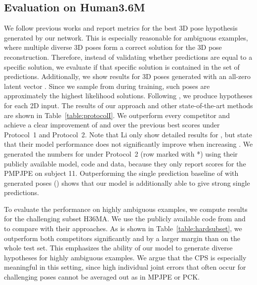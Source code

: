 \documentclass[10pt,twocolumn,letterpaper]{article}
\begin{document}
\subsection{Evaluation on Human3.6M}
We follow previous works and report metrics for the best 3D pose hypothesis generated by our network. 
This is especially reasonable for ambiguous examples, where multiple diverse 3D poses form a correct solution for the 3D pose reconstruction.
Therefore, instead of validating whether predictions are equal to a specific solution, we evaluate if that specific solution is contained in the set of predictions.
Additionally, we show results for 3D poses generated with an all-zero latent vector .
Since we sample  from  during training, such poses are approximately the highest likelihood solutions.
Following \cite{Sharma_2019_ICCV}, we produce  hypotheses for each 2D input. 
The results of our approach and other state-of-the-art methods are shown in Table~\ref{table:protocolI}. 
We outperform every competitor and achieve a clear improvement of  and  over the previous best scores under Protocol~1 and Protocol~2.
Note that Li \etal \cite{Li_2019_CVPR} only show detailed results for , but state that their model performance does not significantly improve when increasing .
We generated the numbers for \cite{Sharma_2019_ICCV} under Protocol~2 (row marked with *) using their publicly available model, code and data, because they only report scores for the PMPJPE on subject 11.
Outperforming the single prediction baseline of \cite{martinez_2017_3dbaseline} with  generated poses (\ie ) shows that our model is additionally able to give strong single predictions.

To evaluate the performance on highly ambiguous examples, we compute results for the challenging subset H36MA. 
We use the publicly available code from \cite{Sharma_2019_ICCV} and \cite{Li_2019_CVPR} to compare with their approaches.
As is shown in Table~\ref{table:hardsubset}, we outperform both competitors significantly and by a larger margin than on the whole test set.
This emphasizes the ability of our model to generate diverse hypotheses for highly ambiguous examples.
We argue that the CPS is especially meaningful in this setting, since high individual joint errors that often occur for challenging poses cannot be averaged out as in \eg MPJPE or PCK.
\end{document}
